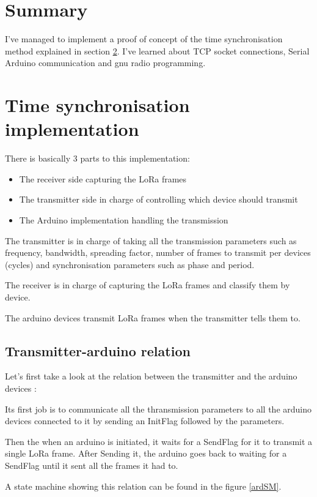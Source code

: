 \documentclass[a4paper, 12pt]{article}
\begin{document}
\section{Summary}
I've managed to implement a proof of concept of the time synchronisation method explained in section \ref{TSi}.
I've learned about TCP socket connections, Serial Arduino communication and gnu radio programming.

\section{Time synchronisation implementation} \label{TSi}
There is basically 3 parts to this implementation: 
\begin{itemize}
  \item The receiver side capturing the LoRa frames
  \item The transmitter side in charge of controlling which device should transmit
  \item The Arduino implementation handling the transmission
\end{itemize}

The transmitter is in charge of taking all the transmission parameters such as frequency, bandwidth, spreading factor, number of frames to transmit per devices (cycles) and synchronisation parameters such as phase and period.

The receiver is in charge of capturing the LoRa frames and classify them by device.

The arduino devices transmit LoRa frames when the transmitter tells them to.

\vspace{1cm}

\subsection{Transmitter-arduino relation}
Let's first take a look at the relation between the transmitter and the arduino devices :

Its first job is to communicate all the thransmission parameters to all the arduino devices connected to it by sending an InitFlag followed by the parameters. 

Then the when an arduino is initiated, it waits for a SendFlag for it to transmit a single LoRa frame. After Sending it, the arduino goes back to waiting for a SendFlag until it sent all the frames it had to.

A state machine showing this relation can be found in the figure \ref{ardSM}.
\end{document}
